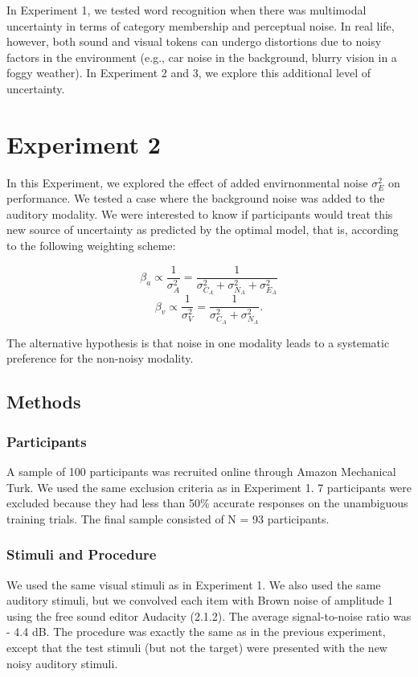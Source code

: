 \documentclass[english,,man,floatsintext]{apa6}
\theoremstyle{definition}
\theoremstyle{definition}
\theoremstyle{definition}
\theoremstyle{remark}
\begin{document}
In Experiment 1, we tested word recognition when there was multimodal
uncertainty in terms of category membership and perceptual noise. In
real life, however, both sound and visual tokens can undergo distortions
due to noisy factors in the environment (e.g., car noise in the
background, blurry vision in a foggy weather). In Experiment 2 and 3, we
explore this additional level of uncertainty.

\section{Experiment 2}\label{experiment-2}

In this Experiment, we explored the effect of added envirnonmental noise
\(\sigma^2_{E}\) on performance. We tested a case where the background
noise was added to the auditory modality. We were interested to know if
participants would treat this new source of uncertainty as predicted by
the optimal model, that is, according to the following weighting scheme:

\[\beta_a \propto \frac{1}{\sigma^2_{A}} = \frac{1}{\sigma^2_{C_A}+\sigma^2_{N_A} + \sigma^2_{E_A}}\]
\[\beta_v \propto \frac{1}{\sigma^2_{V}} = \frac{1}{\sigma^2_{C_A}+\sigma^2_{N_A}}.\]

The alternative hypothesis is that noise in one modality leads to a
systematic preference for the non-noisy modality.

\subsection{Methods}\label{methods-1}

\subsubsection{Participants}\label{participants-1}

A sample of 100 participants was recruited online through Amazon
Mechanical Turk. We used the same exclusion criteria as in Experiment 1.
7 participants were excluded because they had less than 50\% accurate
responses on the unambiguous training trials. The final sample consisted
of N = 93 participants.

\subsubsection{Stimuli and Procedure}\label{stimuli-and-procedure}

We used the same visual stimuli as in Experiment 1. We also used the
same auditory stimuli, but we convolved each item with Brown noise of
amplitude 1 using the free sound editor Audacity (2.1.2). The average
signal-to-noise ratio was - 4.4 dB. The procedure was exactly the same
as in the previous experiment, except that the test stimuli (but not the
target) were presented with the new noisy auditory stimuli.
\end{document}
